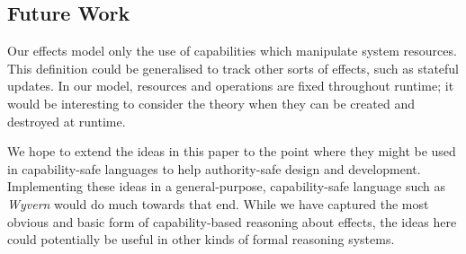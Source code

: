 \vspace{-0.6cm}
\subsection{Future Work}
\vspace{-0.2cm}

Our effects model only the use of capabilities which manipulate system resources. This definition could be generalised to track other sorts of effects, such as stateful updates. In our model, resources and operations are fixed throughout runtime; it would be interesting to consider the theory when they can be created and destroyed at runtime.

We hope to extend the ideas in this paper to the point where they might be used in capability-safe languages to help authority-safe design and development. Implementing these ideas in a general-purpose, capability-safe language such as \textit{Wyvern}
would do much towards that end.
While we have captured the most obvious and basic form of capability-based reasoning about effects, the ideas here could potentially be useful in other kinds of formal reasoning systems.


